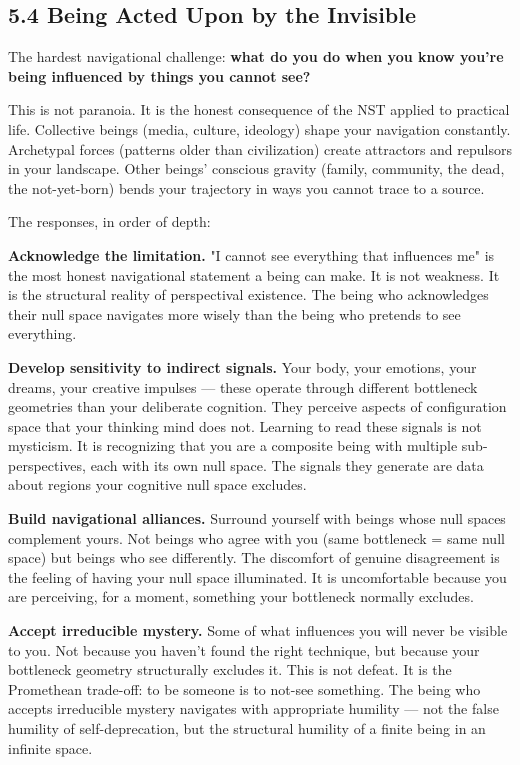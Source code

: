 \subsection*{5.4 Being Acted Upon by the Invisible}


The hardest navigational challenge: \textbf{what do you do when you know you're being influenced by things you cannot see?}


This is not paranoia. It is the honest consequence of the NST applied to practical life. Collective beings (media, culture, ideology) shape your navigation constantly. Archetypal forces (patterns older than civilization) create attractors and repulsors in your landscape. Other beings' conscious gravity (family, community, the dead, the not-yet-born) bends your trajectory in ways you cannot trace to a source.


The responses, in order of depth:


\textbf{Acknowledge the limitation.} "I cannot see everything that influences me" is the most honest navigational statement a being can make. It is not weakness. It is the structural reality of perspectival existence. The being who acknowledges their null space navigates more wisely than the being who pretends to see everything.


\textbf{Develop sensitivity to indirect signals.} Your body, your emotions, your dreams, your creative impulses — these operate through different bottleneck geometries than your deliberate cognition. They perceive aspects of configuration space that your thinking mind does not. Learning to read these signals is not mysticism. It is recognizing that you are a composite being with multiple sub-perspectives, each with its own null space. The signals they generate are data about regions your cognitive null space excludes.


\textbf{Build navigational alliances.} Surround yourself with beings whose null spaces complement yours. Not beings who agree with you (same bottleneck = same null space) but beings who see differently. The discomfort of genuine disagreement is the feeling of having your null space illuminated. It is uncomfortable because you are perceiving, for a moment, something your bottleneck normally excludes.


\textbf{Accept irreducible mystery.} Some of what influences you will never be visible to you. Not because you haven't found the right technique, but because your bottleneck geometry structurally excludes it. This is not defeat. It is the Promethean trade-off: to be someone is to not-see something. The being who accepts irreducible mystery navigates with appropriate humility — not the false humility of self-deprecation, but the structural humility of a finite being in an infinite space.


